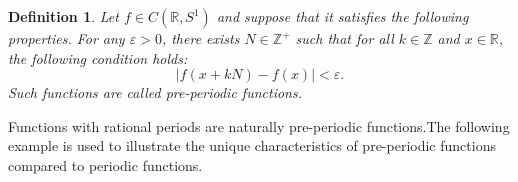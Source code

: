 \documentclass[11pt]{article}
\newtheorem{definition}{Definition}[section]
\theoremstyle{remark}
\begin{document}
\begin{definition}
    Let \( f \in C(\mathbb{R}, S^1) \) and suppose that it satisfies the following properties. For any \( \varepsilon > 0 \), there exists \( N\in \mathbb{Z}^+ \) such that for all \( k \in \mathbb{Z} \) and \( x \in \mathbb{R} \), the following condition holds:
\begin{equation}
    \lvert f(x + kN) - f(x) \rvert < \varepsilon.
\end{equation}
Such functions are called pre-periodic functions.

\end{definition}
Functions with rational periods are naturally pre-periodic functions.The following example is used to illustrate the unique characteristics of pre-periodic functions compared to periodic functions.
\end{document}
